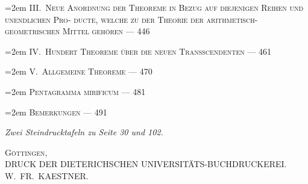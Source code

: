 \documentclass[12pt,a4paper]{article}
\begin{document}
\vspace{0.3em}
\noindent\hangindent=2em
III.\ \textsc{Neue Anordnung der Theoreme in Bezug auf diejenigen Reihen und unendlichen Pro-\linebreak
\hspace*{\fill} ducte, welche zu der Theorie der arithmetisch-geometrischen Mittel geh\"oren \dotfill --- 446}

\vspace{0.3em}
\noindent\hangindent=2em
IV.\ \textsc{Hundert Theoreme \"uber die neuen Transscendenten \dotfill --- 461}

\vspace{0.3em}
\noindent\hangindent=2em
V.\ \textsc{Allgemeine Theoreme \dotfill --- 470}

\vspace{0.3em}
\noindent\hangindent=2em
\textsc{Pentagramma mirificum \dotfill --- 481}

\vspace{0.3em}
\noindent\hangindent=2em
\textsc{Bemerkungen \dotfill --- 491}

\vspace{0.5em}
\noindent\textit{Zwei Steindrucktafeln zu Seite 30 und 102.}

\newpage

\thispagestyle{empty}
\vspace*{\fill}
\begin{center}
\textsc{G\"ottingen,}\\[0.3em]
DRUCK DER DIETERICHSCHEN UNIVERSIT\"ATS-BUCHDRUCKEREI.\\[0.3em]
W.\ FR.\ KAESTNER.
\end{center}
\vspace*{\fill}

\newpage
\thispagestyle{empty}
\null
\newpage
\thispagestyle{empty}
\null
\newpage
\thispagestyle{empty}
\null
\newpage
\thispagestyle{empty}
\null
\newpage
\thispagestyle{empty}
\null
\end{document}
